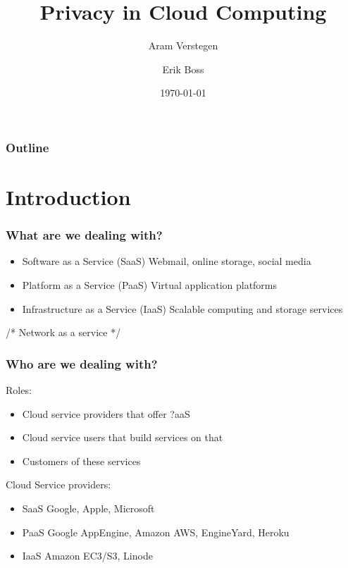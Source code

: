 \documentclass{beamer}
\title{Privacy in Cloud Computing}
\author{Aram Verstegen \and Erik Boss}
\institute{Radboud University Nijmegen}
\date{\today}
\begin{document}
\begin{frame}
  \titlepage
\end{frame}

\begin{frame}
  \frametitle{Outline}
\end{frame}


\section{Introduction}

\begin{frame}
    \frametitle{What are we dealing with?}
    \begin{itemize}	
    \item \small Software as a Service (SaaS)
      \scriptsize{Webmail, online storage, social media}
    \item \small Platform as a Service (PaaS)
      \scriptsize{Virtual application platforms}
    \item \small Infrastructure as a Service (IaaS)
      \scriptsize{Scalable computing and storage services}
    \end{itemize}
    /* Network as a service */
\end{frame}

\begin{frame}
    \frametitle{Who are we dealing with?}
    Roles:
    \begin{itemize} %
      \item Cloud service providers that offer ?aaS
      \item Cloud service users that build services on that
      \item Customers of these services
    \end{itemize}

    Cloud Service providers:
    \begin{itemize}	
    \item \small SaaS
      \scriptsize{Google, Apple, Microsoft}
    \item \small PaaS
      \scriptsize{Google AppEngine, Amazon AWS, EngineYard, Heroku}
    \item \small IaaS
      \scriptsize{Amazon EC3/S3, Linode}
    \end{itemize}

\end{frame}
\end{document}
